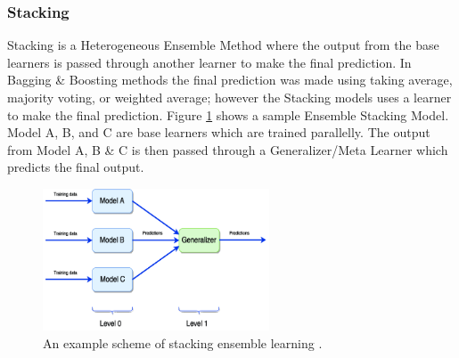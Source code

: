 \documentclass[twoside,11pt,a4paper]{article}
\begin{document}
\subsubsection{Stacking}
Stacking is a Heterogeneous Ensemble Method where the output from the base learners is passed through another learner to make the final prediction. In Bagging \& Boosting methods the final prediction was made using taking average, majority voting, or weighted average; however the Stacking models uses a learner to make the final prediction. Figure \ref{fig:stacking} shows a sample Ensemble Stacking Model. Model A, B, and C are base learners which are trained parallelly. The output from Model A, B \& C is then passed through a Generalizer/Meta Learner which predicts the final output. \\
\begin{figure}[ht]
	\centering
	\includegraphics[width=0.6\textwidth]{stacking}
	\caption[An example scheme of stacking ensemble learning. ]{An example scheme of stacking ensemble learning \cite{divina2018stacking}.}
	\label{fig:stacking}
\end{figure}
\FloatBarrier
\end{document}
